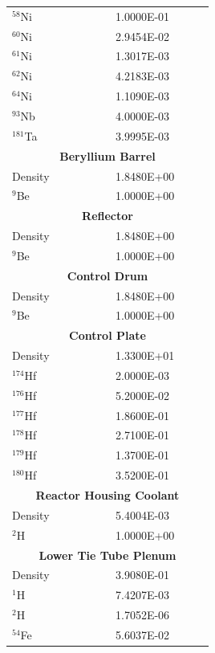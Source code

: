 \documentclass[8pt,a4paper]{article}
\begin{document}
\begin{longtable}{|m{0.3\linewidth}|m{0.2\linewidth}|}
    $^{58}$Ni & \SI{1.0000E-01}{} \\
    $^{60}$Ni & \SI{2.9454E-02}{} \\
    $^{61}$Ni & \SI{1.3017E-03}{} \\
    $^{62}$Ni & \SI{4.2183E-03}{} \\
    $^{64}$Ni & \SI{1.1090E-03}{} \\
    $^{93}$Nb & \SI{4.0000E-03}{} \\
    $^{181}$Ta & \SI{3.9995E-03}{} \\\hline
    \multicolumn{2}{|c|}{\textbf{Beryllium Barrel}}\\\hline
    Density & \SI{1.8480E+00}{} \\
    $^{9}$Be & \SI{1.0000E+00}{} \\\hline
    \multicolumn{2}{|c|}{\textbf{Reflector}}\\\hline
    Density & \SI{1.8480E+00}{} \\
    $^{9}$Be & \SI{1.0000E+00}{} \\\hline
    \multicolumn{2}{|c|}{\textbf{Control Drum}}\\\hline
    Density & \SI{1.8480E+00}{} \\
    $^{9}$Be & \SI{1.0000E+00}{} \\\hline
    \multicolumn{2}{|c|}{\textbf{Control Plate}}\\\hline
    Density & \SI{1.3300E+01}{} \\
    $^{174}$Hf & \SI{2.0000E-03}{} \\
    $^{176}$Hf & \SI{5.2000E-02}{} \\
    $^{177}$Hf & \SI{1.8600E-01}{} \\
    $^{178}$Hf & \SI{2.7100E-01}{} \\
    $^{179}$Hf & \SI{1.3700E-01}{} \\
    $^{180}$Hf & \SI{3.5200E-01}{} \\\hline
    \multicolumn{2}{|c|}{\textbf{Reactor Housing Coolant}}\\\hline
    Density & \SI{5.4004E-03}{} \\
    $^{2}$H & \SI{1.0000E+00}{} \\\hline
    \multicolumn{2}{|c|}{\textbf{Lower Tie Tube Plenum}}\\\hline
    Density & \SI{3.9080E-01}{} \\
    $^{1}$H & \SI{7.4207E-03}{} \\
    $^{2}$H & \SI{1.7052E-06}{} \\
    $^{54}$Fe & \SI{5.6037E-02}{} \\

\end{longtable}
\end{document}
